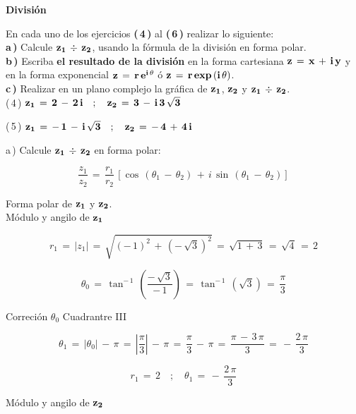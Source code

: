 \documentclass[a4paper,11pt,openany]{book}
\begin{document}
\begin{center}
\textbf{División}
\end{center}

En cada uno de los ejercicios \textbf{(\,4\,)} al \textbf{(\,6\,)} realizar lo siguiente:\\

\textbf{a\,)} Calcule $\bf{z_{1}\,\div\,z_{2}}$, usando la fórmula de la división en forma polar.\\

\textbf{b\,)} Escriba \textbf{el resultado de la división} en la forma cartesiana $\bf{z\,=\,x\,+\,i\,y}$ y en la forma exponencial $\bf{z\,=\,r\,e^{i\,\theta}}$ ó $\bf{z\,=\,r\,exp\,(i\,\theta)}$.\\

\textbf{c\,)} Realizar en un plano complejo la gráfica de $\bf{z_{1}}$, $\bf{z_{2}}$ y $\bf{z_{1}\,\div\,z_{2}}$.\\

\textcolor{ao(english)}{(\,4\,)} $\bf{z_{1}\,=\,2\,-\,2\,i \quad;\quad z_{2}\,=\,3\,-\,i\,3\,\sqrt{3}}$

\textcolor{ao(english)}{(\,5\,)} $\bf{z_{1}\,=\,-\,1\,-\,i\,\sqrt{3} \quad;\quad z_{2}\,=\,-\,4\,+\,4\,i}$

\textcolor{ao(english)}{a\,)} Calcule $\bf{z_{1}\,\div\,z_{2}}$ en forma polar:

$$\dfrac{z_{1}}{z_{2}}\,=\,\dfrac{r_{1}}{r_{2}}\,\left[\cos\,(\theta_{1}\,-\,\theta_{2})\,+\,i\,\sin\,(\theta_{1}\,-\,\theta_{2})\right]$$

\textcolor{ao(english)}{} Forma polar de $\bf{z_{1}}$ y $\bf{z_{2}}$.\\

\textcolor{ao(english)}{} Módulo y angilo de $\bf{z_{1}}$ 

$$r_{1}\,=\,|z_{1}|\,=\,\sqrt{(-\,1)^{2}\,+\,(-\,\sqrt{3})^{2}}\,=\,\sqrt{1\,+\,3}\,=\,\sqrt{4}\,=\,2$$

$$\theta_{0}\,=\,\tan^{-\,1}\,\left(\dfrac{-\,\sqrt{3}}{-\,1}\right)\,=\,\tan^{-\,1}\,(\sqrt{3})\,=\,\dfrac{\pi}{3}$$

\textcolor{ao(english)}{} Correción $\theta_{0}$ Cuadrantre III

$$\theta_{1}\,=\,|\theta_{0}|\,-\,\pi\,=\,\left|\dfrac{\pi}{3}\right|\,-\,\pi\,=\,\dfrac{\pi}{3}\,-\,\pi\,=\,\dfrac{\pi\,-\,3\,\pi}{3}\,=\,-\,\dfrac{2\,\pi}{3}$$

$$\boxed{r_{1}\,=\,2 \quad;\quad \theta_{1}\,=\,-\,\dfrac{2\,\pi}{3}}$$

\textcolor{ao(english)}{} Módulo y angilo de $\bf{z_{2}}$ 
\end{document}
